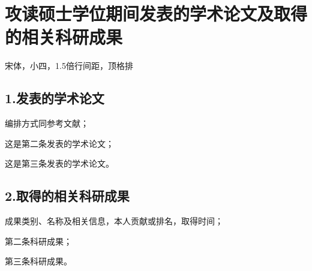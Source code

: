 \chapter*{攻读硕士学位期间发表的学术论文及取得的相关科研成果}
\pagestyle{plain}

宋体，小四，1.5倍行间距，顶格排

\section*{1.发表的学术论文}
\begin{enumerate}[label={[\arabic*]}]
    \item 编排方式同参考文献；
    \item 这是第二条发表的学术论文；
    \item 这是第三条发表的学术论文。
\end{enumerate}
\section*{2.取得的相关科研成果}
\begin{enumerate}[label={[\arabic*]}]
    \item 成果类别、名称及相关信息，本人贡献或排名，取得时间；
    \item 第二条科研成果；
    \item 第三条科研成果。
\end{enumerate}










